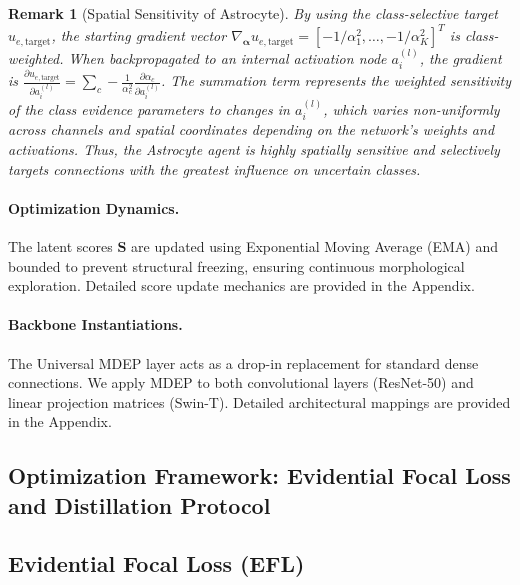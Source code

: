 \documentclass[letterpaper]{article} %
\newtheorem{remark}{Remark}
\begin{document}
\begin{remark}[Spatial Sensitivity of Astrocyte]
By using the class-selective target $u_{e,\text{target}}$, the starting gradient vector $\nabla_{\bm{\alpha}} u_{e,\text{target}} = [-1/\alpha_1^2, \ldots, -1/\alpha_K^2]^T$ is class-weighted. When backpropagated to an internal activation node $a_i^{(l)}$, the gradient is $\frac{\partial u_{e,\text{target}}}{\partial a_i^{(l)}} = \sum_c -\frac{1}{\alpha_c^2} \frac{\partial \alpha_c}{\partial a_i^{(l)}}$. The summation term represents the weighted sensitivity of the class evidence parameters to changes in $a_i^{(l)}$, which varies non-uniformly across channels and spatial coordinates depending on the network's weights and activations. Thus, the Astrocyte agent is highly spatially sensitive and selectively targets connections with the greatest influence on uncertain classes.
\end{remark}

\paragraph{Optimization Dynamics.} The latent scores $\bm{S}$ are updated using Exponential Moving Average (EMA) and bounded to prevent structural freezing, ensuring continuous morphological exploration. Detailed score update mechanics are provided in the Appendix.

\paragraph{Backbone Instantiations.} The Universal MDEP layer acts as a drop-in replacement for standard dense connections. We apply MDEP to both convolutional layers (ResNet-50) and linear projection matrices (Swin-T). Detailed architectural mappings are provided in the Appendix.

\subsection{Optimization Framework: Evidential Focal Loss and Distillation Protocol}\label{sec:optimization}

\subsection{Evidential Focal Loss (EFL)}\label{subsec:efl}
\end{document}
